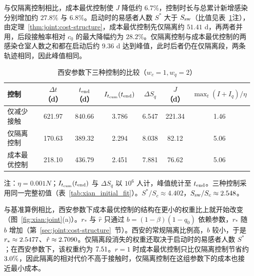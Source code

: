 与仅隔离控制相比，成本最优控制使 $J$ 降低约 $6.7\%$，控制时长与总累计新增感染分别增加约 $27.8\%$ 与 $6.8\%$。启动时的易感者人数 $S^*$ 大于 $S_{\rm sw}$（比值见表~\ref{tab:xian:joint-compare}注），由定理~\ref{thm:joint:cost-structure}，成本最优控制先仅隔离约 $51.41$ d，再两者并用，后段接触率相对 $c_0$ 的最大降幅约为 $28.2\%$。仅隔离控制与成本最优控制的两感染仓室人数之和都在启动后约 $9.36$ d 达到峰值，此时后者仍在仅隔离段，两条轨迹相同，因此峰值相同。
\begin{table}[htbp]
\centering\small
\setlength{\tabcolsep}{3pt}
\renewcommand{\arraystretch}{1.25}
\begin{threeparttable}
\caption{西安参数下三种控制的比较（$w_c=1,w_q=2$）}
\label{tab:xian:joint-compare}
\begin{tabular*}{\linewidth}{@{\extracolsep{\fill}}lcccccc@{}}
\toprule
控制 & $\Delta t$（d） & $t_{\rm end}$（d） & $I_{t_{\mathrm{cum}}}(t_{\rm end})$ & $\Delta S_q$ & $J$（d） & $\max_t(I+I_q)/\eta$\\
\midrule
仅减少接触 & 621.97 & 840.66 & 3.786 & 6.547 & 221.34 & 1.46\\
仅隔离控制 & 170.63 & 389.32 & 2.294 & 8.038 & 82.12 & 5.06\\
成本最优控制 & 218.10 & 436.79 & 2.451 & 7.881 & 76.62 & 5.06\\
\bottomrule
\end{tabular*}
\begin{tablenotes}[flushleft]\footnotesize
\item 注：$\eta=0.001N$；$I_{t_{\mathrm{cum}}}(t_{\rm end})$ 与 $\Delta S_q$ 以 $10^6$ 人计，峰值统计至 $t_{\rm end}$。三种控制采用同一完整初值（表~\ref{tab:xian_initial_fit}）。$S^*/S_c\approx 4.402$，$S_{\rm sw}/S_c\approx 2.548$。
\end{tablenotes}
\end{threeparttable}
\end{table}

与基准算例相比，西安参数下成本最优控制的结构在更小的权重比上就开始改变（图~\ref{fig:xian:joint}(a)）。$r_*$ 与 $\hat r$ 只通过 $b=(1-\beta)(1-q_0)$ 依赖参数，$r_*$ 随 $b$ 增加（第~\ref{sec:joint:cost-structure}~节）。西安的常规隔离比例高，$b$ 较小，于是 $r_*\approx2.5477$、$\hat r\approx2.7090$。仅隔离段消失的权重还取决于启动时的易感者人数 $S^*$；在西安参数下，该权重约为 $7.51$。$r=1$ 时成本最优控制只比仅隔离控制节省约 $3.0\%$，因此隔离的相对代价不高于接触时，仅隔离控制在这组参数下的成本也接近最小成本。

